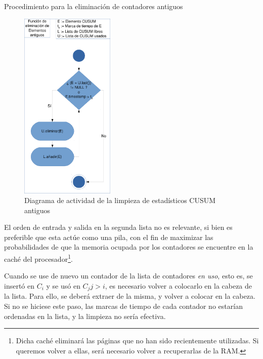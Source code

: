 \begin{algorithm}
 \caption{Procedimiento para la eliminación de contadores antiguos}
\end{algorithm}

\begin{figure}[htbp]
\centering
\includegraphics[width=0.4\textwidth]{CapituloEstructura/Figuras/ActividadFuncionLimpiarPoolCUSUM-crop}
\caption{Diagrama de actividad de la limpieza de estadísticos CUSUM antiguos}
\end{figure}
%

El orden de entrada y salida en la segunda lista no es relevante, si bien es preferible que esta actúe como una pila, 
con el fin de maximizar las probabilidades de que la memoria ocupada por los contadores se encuentre en la caché del 
procesador\footnote{Dicha caché eliminará las páginas que no han sido recientemente utilizadas. Si queremos volver a 
ellas, será necesario volver a recuperarlas de la RAM.}.

Cuando se use de nuevo un contador de la lista de contadores \emph{en uso}, esto es, se insertó en $C_i$ y se usó en 
$C_j j>i$, es necesario volver a colocarlo en la cabeza de la lista. Para ello, se deberá extraer de la misma, y volver 
a colocar en la cabeza. Si no se hiciese este paso, las marcas de tiempo de cada contador no estarían ordenadas en la 
lista, y la limpieza no sería efectiva.

